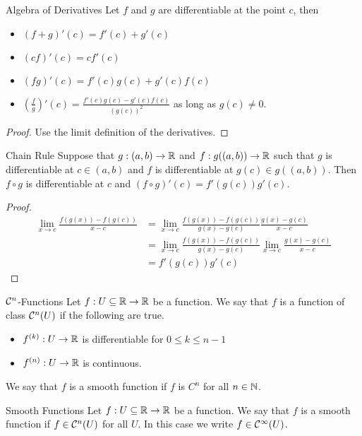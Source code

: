 \documentclass[a4paper]{article}
\begin{document}
\begin{thm}{Algebra of Derivatives}{} Let $f$ and $g$ are differentiable at the point $c$, then
\begin{itemize}
\item $(f+g)'(c)=f'(c)+g'(c)$
\item $(cf)'(c)=cf'(c)$
\item $(fg)'(c)=f'(c)g(c)+g'(c)f(c)$
\item $\left(\frac{f}{g}\right)'(c)=\frac{f'(c)g(c)-g'(c)f(c)}{\left(g(c)\right)^2}$ as long as $g(c)\neq 0$. 
\end{itemize}\tcbline
\begin{proof} Use the limit definition of the derivatives. 
\end{proof}
\end{thm}

\begin{thm}{Chain Rule}{} Suppose that $g:(a,b)\to\mathbb{R}$ and $f:g((a,b))\to\mathbb{R}$ such that $g$ is differentiable at $c\in(a,b)$ and $f$ is differentiable at $g(c)\in g((a,b))$. Then $f\circ g$ is differentiable at $c$ and $(f\circ g)'(c)=f'(g(c))g'(c)$. \tcbline
\begin{proof}
\begin{align*}
\lim_{x\to c}\frac{f(g(x))-f(g(c))}{x-c}&=\lim_{x\to c}\frac{f(g(x))-f(g(c))}{g(x)-g(c)}\frac{g(x)-g(c)}{x-c}\\
&=\lim_{x\to c}\frac{f(g(x))-f(g(c))}{g(x)-g(c)}\lim_{x\to c}\frac{g(x)-g(c)}{x-c}\\
&=f'(g(c))g'(c)
\end{align*}
\end{proof}
\end{thm}

\begin{defn}{$\mathcal{C}^n$-Functions}{} Let $f:U\subseteq\mathbb{R}\to\mathbb{R}$ be a function. We say that $f$ is a function of class $\mathcal{C}^n(U)$ if the following are true. 
\begin{itemize}
\item $f^{(k)}:U\to\mathbb{R}$ is differentiable for $0\leq k\leq n-1$
\item $f^{(n)}:U\to\mathbb{R}$ is continuous. 
\end{itemize}
We say that $f$ is a smooth function if $f$ is $C^n$ for all $n\in\mathbb{N}$. 
\end{defn}

\begin{defn}{Smooth Functions}{} Let $f:U\subseteq\mathbb{R}\to\mathbb{R}$ be a function. We say that $f$ is a smooth function if $f\in\mathcal{C}^n(U)$ for all $U$. In this case we write $f\in\mathcal{C}^\infty(U)$. 
\end{defn}
\end{document}
